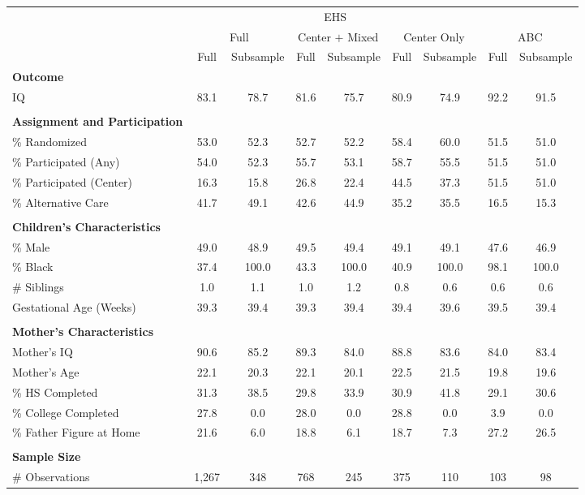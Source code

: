 \begin{tabular}{lcccccccc}
\toprule 
\midrule 
 & \multicolumn{6}{c}{EHS} & \multicolumn{2}{c}{} \\
 \cmidrule(lr){2-7} \cmidrule(lr){8-9} 
 & \multicolumn{2}{c}{Full} & \multicolumn{2}{c}{Center $+$ Mixed} & \multicolumn{2}{c}{Center Only} & \multicolumn{2}{c}{ABC} \\
 \cmidrule(lr){2-3} \cmidrule(lr){4-5} \cmidrule(lr){6-7} \cmidrule(lr){8-9} 
 & Full & Subsample & Full & Subsample & Full & Subsample & Full & Subsample \\
\midrule 
\textbf{Outcome} \\
\quad IQ & 83.1 & 78.7 & 81.6 & 75.7 & 80.9 & 74.9 & 92.2 & 91.5 \\
 \\
\textbf{Assignment and Participation} \\
\quad \% Randomized & 53.0 & 52.3 & 52.7 & 52.2 & 58.4 & 60.0 & 51.5 & 51.0 \\
\quad \% Participated (Any) & 54.0 & 52.3 & 55.7 & 53.1 & 58.7 & 55.5 & 51.5 & 51.0 \\
\quad \% Participated (Center) & 16.3 & 15.8 & 26.8 & 22.4 & 44.5 & 37.3 & 51.5 & 51.0 \\
\quad \% Alternative Care & 41.7 & 49.1 & 42.6 & 44.9 & 35.2 & 35.5 & 16.5 & 15.3 \\
 \\
\textbf{Children's Characteristics} \\
\quad \% Male & 49.0 & 48.9 & 49.5 & 49.4 & 49.1 & 49.1 & 47.6 & 46.9 \\
\quad \% Black & 37.4 & 100.0 & 43.3 & 100.0 & 40.9 & 100.0 & 98.1 & 100.0 \\
\quad \# Siblings & 1.0 & 1.1 & 1.0 & 1.2 & 0.8 & 0.6 & 0.6 & 0.6 \\
\quad Gestational Age (Weeks) & 39.3 & 39.4 & 39.3 & 39.4 & 39.4 & 39.6 & 39.5 & 39.4 \\
 \\
\textbf{Mother's Characteristics} \\
\quad Mother's IQ & 90.6 & 85.2 & 89.3 & 84.0 & 88.8 & 83.6 & 84.0 & 83.4 \\
\quad Mother's Age & 22.1 & 20.3 & 22.1 & 20.1 & 22.5 & 21.5 & 19.8 & 19.6 \\
\quad \% HS Completed & 31.3 & 38.5 & 29.8 & 33.9 & 30.9 & 41.8 & 29.1 & 30.6 \\
\quad \% College Completed & 27.8 & 0.0 & 28.0 & 0.0 & 28.8 & 0.0 & 3.9 & 0.0 \\
\quad \% Father Figure at Home & 21.6 & 6.0 & 18.8 & 6.1 & 18.7 & 7.3 & 27.2 & 26.5 \\
 \\
\textbf{Sample Size} \\
\quad \# Observations & 1,267 & 348 & 768 & 245 & 375 & 110 & 103 & 98 \\
\midrule 
\bottomrule 
\end{tabular}
